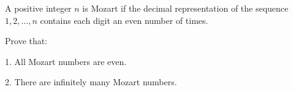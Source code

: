 A positive integer $n$ is Mozart if the decimal representation of the sequence $1, 2, \ldots, n$ contains each digit an even number of times.

Prove that:

1. All Mozart numbers are even.

2. There are infinitely many Mozart numbers.